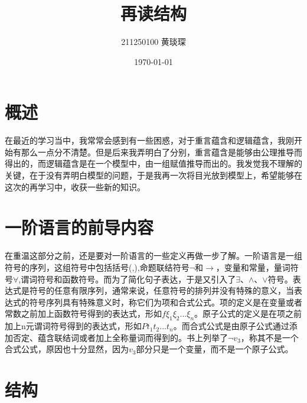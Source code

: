 \documentclass{article}
\title{再读结构}
\author{211250100 黄琰琛}
\date{\today}
\begin{document}
\newpage
\maketitle
\tableofcontents

\newpage
\section{概述 }
在最近的学习当中，我常常会感到有一些困惑，对于重言蕴含和逻辑蕴含，我刚开始有那么一点分不清楚。但是后来我弄明白了分别，重言蕴含是能够由公理推导而得出的，而逻辑蕴含是在一个模型中，由一组赋值推导而出的。我发觉我不理解的关键，在于没有弄明白模型的问题，于是我再一次将目光放到模型上，希望能够在这次的再学习中，收获一些新的知识。\\

\section{一阶语言的前导内容 }
在重温这部分之前，还是要对一阶语言的一些定义再做一步了解。一阶语言是一组符号的序列，这组符号中包括括号(,),命题联结符号$\neg$和$\rightarrow$，变量和常量，量词符号$\forall$,谓词符号和函数符号。而为了简化句子表达，于是又引入了$\exists$、$\land$、$\lor$符号。表达式是符号的任意有限序列，通常来说，任意符号的排列并没有特殊的意义，当表达式的符号序列具有特殊意义时，称它们为项和合式公式。项的定义是在变量或者常数之前加上函数符号得到的表达式，形如$f\xi_{1}\xi_{2}...\xi_{n}$。原子公式的定义是在项之前加上n元谓词符号得到的表达式，形如$Pt_1t_2...t_n$。而合式公式是由原子公式通过添加否定、蕴含联结词或者加上全称量词而得到的。书上列举了$\neg v_3$，称其不是一个合式公式，原因也十分显然，因为$v_3$部分只是一个变量，而不是一个原子公式。\cite{example_article}\\

\section{结构 }
\end{document}
